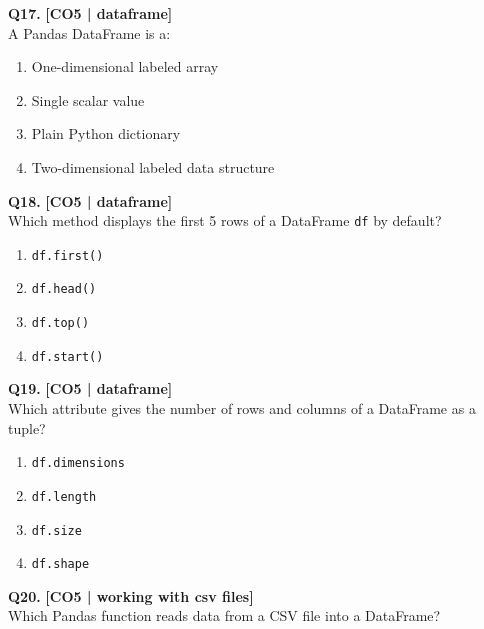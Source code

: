 \noindent\textbf{Q17.} \hfill {\small\color{LPUOrange}\textbf{[CO5 | dataframe]}}\\[2pt]
A Pandas DataFrame is a:

\begin{enumerate}[label=(\alph*),topsep=2pt,itemsep=1pt,partopsep=0pt,parsep=0pt]
    \item \relax One-dimensional labeled array
    \item \relax Single scalar value
    \item \relax Plain Python dictionary
    \item \relax Two-dimensional labeled data structure
\end{enumerate}
\vspace{{2mm}}

\noindent\textbf{Q18.} \hfill {\small\color{LPUOrange}\textbf{[CO5 | dataframe]}}\\[2pt]
Which method displays the first 5 rows of a DataFrame \texttt{df} by default?

\begin{enumerate}[label=(\alph*),topsep=2pt,itemsep=1pt,partopsep=0pt,parsep=0pt]
    \item \relax \texttt{df.first()}
    \item \relax \texttt{df.head()}
    \item \relax \texttt{df.top()}
    \item \relax \texttt{df.start()}
\end{enumerate}
\vspace{{2mm}}

\noindent\textbf{Q19.} \hfill {\small\color{LPUOrange}\textbf{[CO5 | dataframe]}}\\[2pt]
Which attribute gives the number of rows and columns of a DataFrame as a tuple?

\begin{enumerate}[label=(\alph*),topsep=2pt,itemsep=1pt,partopsep=0pt,parsep=0pt]
    \item \relax \texttt{df.dimensions}
    \item \relax \texttt{df.length}
    \item \relax \texttt{df.size}
    \item \relax \texttt{df.shape}
\end{enumerate}
\vspace{{2mm}}

\noindent\textbf{Q20.} \hfill {\small\color{LPUOrange}\textbf{[CO5 | working with csv files]}}\\[2pt]
Which Pandas function reads data from a CSV file into a DataFrame?

